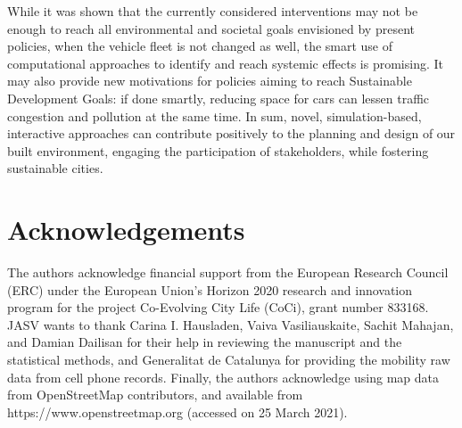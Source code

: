 While it was shown that the currently considered interventions may not be enough to reach all environmental and societal goals envisioned by present policies, when the vehicle fleet is not changed as well, the smart use of computational approaches to identify and reach systemic effects is promising. It may also provide new motivations for policies aiming to reach Sustainable Development Goals: if done smartly, reducing space for cars can lessen traffic congestion and pollution at the same time. In sum, novel, simulation-based, interactive approaches can contribute positively to the planning and design of our built environment, engaging the participation of stakeholders, while fostering sustainable cities. 




\section{Acknowledgements}
The authors acknowledge financial support from the European Research Council (ERC) under the European Union’s Horizon 2020 research and innovation program for the project Co-Evolving City Life (CoCi), grant number 833168. JASV wants to thank Carina I. Hausladen, Vaiva Vasiliauskaite, Sachit Mahajan, and Damian Dailisan for their help in reviewing the manuscript and the statistical methods, and Generalitat de Catalunya for providing the mobility raw data from cell phone records. Finally, the authors acknowledge using map data from OpenStreetMap contributors, and available from https://www.openstreetmap.org (accessed on 25 March 2021).



